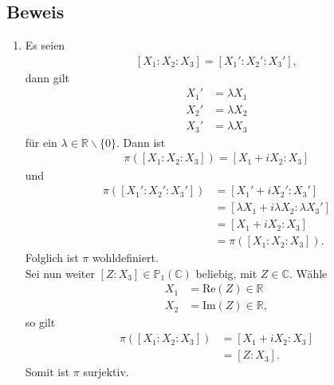 \documentclass[11pt]{article}
\begin{document}
\subsection*{Beweis}
\begin{enumerate}
	\item  Es seien
	\begin{equation*}
	\begin{aligned}
	\left[X_1:X_2:X_3\right] = \left[X_1':X_2':X_3'\right],
	\end{aligned}
	\end{equation*}
	dann gilt
	\begin{equation*}
	\begin{aligned}
	X_1' &= \lambda X_1\\
	X_2' &= \lambda X_2\\
	X_3' &= \lambda X_3
	\end{aligned}
	\end{equation*}
	für ein $ \lambda \in \mathbb{R}\backslash\lbrace0\rbrace $. Dann ist
	\begin{equation*}
	\begin{aligned}
	\pi \left(\left[X_1:X_2:X_3\right]\right) = \left[X_1+iX_2 : X_3\right]
	\end{aligned}
	\end{equation*}
	und
	\begin{equation*}
	\begin{aligned}
	\pi\left(\left[X_1':X_2':X_3'\right]\right) &= \left[X_1'+iX_2':X_3'\right]\\
	&= \left[\lambda X_1+i\lambda X_2:\lambda X_3'\right]\\
	&=\left[X_1+iX_2 : X_3\right]\\
	&= \pi \left(\left[X_1:X_2:X_3\right]\right).
	\end{aligned}
	\end{equation*}
	Folglich ist $ \pi $ wohldefiniert.\\
	Sei nun weiter $ \left[Z : X_3\right] \in \mathbb{P}_1(\mathbb{C}) $ beliebig, mit $ Z \in \mathbb{C} $. Wähle
	\begin{equation*}
	\begin{aligned}
	X_1 &= \mathrm{Re}(Z) \in \mathbb{R}\\
	X_2 &= \mathrm{Im}(Z) \in \mathbb{R},
	\end{aligned}
	\end{equation*}
	so gilt
	\begin{equation*}
	\begin{aligned}
	\pi\left(\left[X_1:X_2:X_3\right]\right) &= \left[X_1+iX_2:X_3\right]\\
	&= \left[Z: X_3\right].
	\end{aligned}
	\end{equation*}
	Somit ist $ \pi $ surjektiv.

\end{enumerate}
\end{document}
